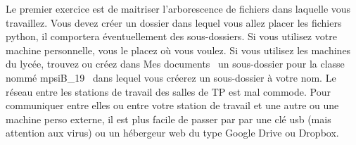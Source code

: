 Le premier exercice est de maitriser l'arborescence de fichiers dans laquelle vous travaillez. Vous devez créer un dossier dans lequel vous allez placer les fichiers python, il comportera éventuellement des sous-dossiers. \newline
Si vous utilisez votre machine personnelle, vous le placez où vous voulez. Si vous utilisez les machines du lycée, trouvez ou créez dans \og Mes documents\fg~ un sous-dossier pour la classe nommé \og mpsiB\_19\fg~ dans lequel vous créerez un sous-dossier à votre nom.\newline
Le réseau entre les stations de travail des salles de TP est mal commode. Pour communiquer entre elles ou entre votre station de travail et une autre ou une machine perso externe, il est plus facile de passer par par une clé usb (mais attention aux virus) ou un hébergeur web du type Google Drive ou Dropbox.
